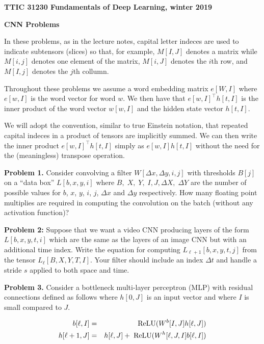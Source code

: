 \documentclass{article}
\newcommand{\solution}[1]{\bigskip {\color{red} {\bf Solution}: #1}}
\begin{document}
\centerline{\bf TTIC 31230 Fundamentals of Deep Learning, winter 2019}

\medskip
\centerline{\bf CNN Problems}


In these problems, as in the lecture notes, capital letter indeces are used to indicate subtensors (slices) so that, for example,  $M[I,J]$ denotes a matrix
while $M[i,j]$ denotes one element of the matrix, $M[i,J]$ denotes the $i$th row, and $M[I,j]$ denotes the $j$th collumn.

\medskip
Throughout these problems we assume a word embedding matrix $e[W,I]$ where $e[w,I]$ is the word vector for word $w$. We then have that $e[w,I]^\top h[t,I]$
is the inner product of the word vector $w[w,I]$ and the hidden state vector $h[t,I]$.

\medskip
We will adopt the convention, similar to true Einstein notation, that repeated capital indeces in a product of tensors are implicitly summed.  We can then write
the inner product $e[w,I]^\top h[t,I]$ simply as $e[w,I]h[t,I]$ without the need for the (meaningless) transpose operation.

\bigskip
{\bf Problem 1.}  Consider convolving a filter $W[\Delta x, \Delta y, i,j]$  with thresholds $B[j]$ on a ``data box'' $L[b,x,y,i]$ where $B,\;X,\;Y,\;I, J,\Delta X,\;\Delta Y$
are the number of possible values for $b$, $x$, $y$, $i$, $j$, $\Delta x$ and $\Delta y$ respectively.
How many floating point multiplies are required
in computing the convolution on the batch (without any activation function)?

\solution{$$BXY\;\Delta X\;\Delta Y \;IJ$$}

\bigskip
{\bf Problem 2:} Suppose that we want a video CNN producing layers of the form $L[b,x,y,t,i]$ which are the same as the layers of an image CNN but with an additional time index.
Write the equation for computing $L_{\ell+1}[b,x,y,t,j]$ from the tensor $L_\ell[B,X,Y,T,I]$.  Your filter should include an index $\Delta t$ and handle a stride $s$ applied
to both space and time.


\bigskip
{\bf Problem 3.}  Consider a bottleneck multi-layer perceptron (MLP) with residual connections defined as follows where $h[0,J]$ is an input vector and where $I$ is small compared to $J$.

\begin{eqnarray*}
  b[\ell,I] & = & \mathrm{ReLU}(W^b[I,J]h[\ell,J]) \\
  h[\ell+1,J] & = & h[\ell,J] +  \;\mathrm{ReLU}(W^h[\ell,J,I]b[\ell,I])
\end{eqnarray*}
\end{document}
